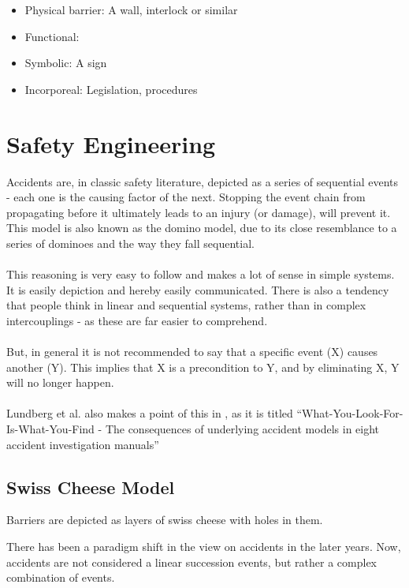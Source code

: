 \begin{itemize}
  \item Physical barrier: A wall, interlock or similar
  \item Functional: 
  \item Symbolic: A sign
  \item Incorporeal: Legislation, procedures
\end{itemize}




\section{Safety Engineering}
Accidents are, in classic safety literature, depicted as a series of sequential events - each one is the causing factor of the next. Stopping the event chain from propagating before it ultimately leads to an injury (or damage), will prevent it. This model is also known as the domino model, due to its close resemblance to a series of dominoes and the way they fall sequential.\\
\\
This reasoning is very easy to follow and makes a lot of sense in simple systems. It is easily depiction and hereby easily communicated. There is also a tendency that people think in linear and sequential systems, rather than in complex intercouplings - as these are far easier to comprehend.\\
\\
But, in general it is not recommended to say that a specific event (X) causes another (Y). This implies that X is a precondition to Y, and by eliminating X, Y will no longer happen\cite{sklet2002methods}.\\
\\
Lundberg et al. also makes a point of this in \cite{lundberg2009you}, as it is titled ``What-You-Look-For-Is-What-You-Find - The consequences of underlying accident models in eight accident investigation manuals''


\subsection{Swiss Cheese Model}

Barriers are depicted as layers of swiss cheese with holes in them. 


There has been a paradigm shift in the view on accidents in the later years. Now, accidents are not considered a linear succession events, but rather a complex combination of events.


